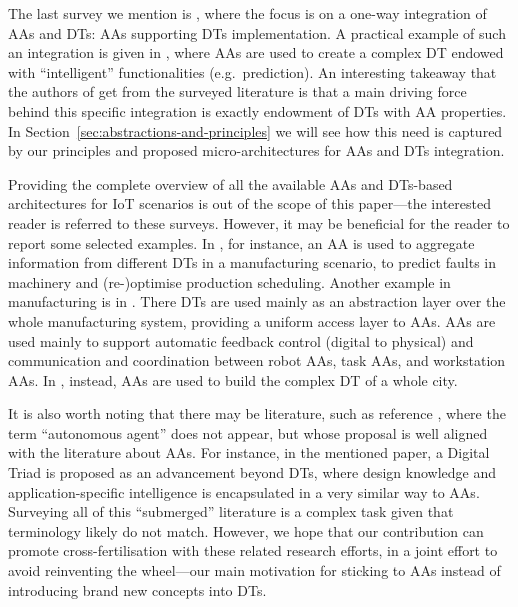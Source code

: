 The last survey we mention is \cite{Kalyani2025}, 
where the focus is on a one-way integration of AAs and DTs: 
AAs supporting DTs implementation. 
A practical example of such an integration is given in \cite{Latsou2021811}, 
where AAs are used to create a complex DT endowed with ``intelligent'' functionalities (e.g.\ prediction). 
An interesting takeaway that the authors of \cite{Kalyani2025} get from the surveyed literature 
is that a main driving force behind this specific integration is exactly endowment of DTs with AA properties. 
In Section~\ref{sec:abstractions-and-principles} we will see how this need is captured by our principles and proposed micro-architectures for AAs and DTs integration.

Providing the complete overview 
of all the available AAs and DTs-based architectures for IoT scenarios 
is out of the scope of this paper---the interested reader is referred to these surveys. 
However, it may be beneficial for the reader
to report some selected examples.
In \cite{Nie2022}, for instance, 
    an AA is used to aggregate information from different DTs in a manufacturing scenario, 
    to predict faults in machinery and (re-)optimise production scheduling.
Another example in manufacturing is in \cite{Xu2024}. 
    There DTs are used mainly as an abstraction layer over the whole manufacturing system, 
    providing a uniform access layer to AAs. 
    AAs are used mainly to support automatic feedback control (digital to physical) 
    and communication and coordination between robot AAs, task AAs, and workstation AAs.
In \cite{DBLP:conf/pads/ClemenALOOSG21}, instead, 
    AAs are used to build the complex DT of a whole city.

It is also worth noting that there may be literature, such as reference \cite{DBLP:journals/jiii/BiZWL22}, 
where the term ``autonomous agent'' does not appear, 
but whose proposal is well aligned with the literature about AAs. 
For instance, in the mentioned paper, 
a Digital Triad is proposed as an advancement beyond DTs, 
where design knowledge and application-specific intelligence is encapsulated 
in a very similar way to AAs. 
Surveying all of this ``submerged'' literature is a complex task given that terminology likely do not match. 
However, we hope that our contribution can promote cross-fertilisation with these related research efforts, 
in a joint effort to avoid reinventing the wheel---our main motivation for sticking to AAs instead of introducing brand new concepts into DTs.
    
